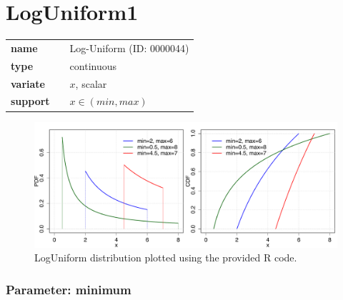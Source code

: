 %
%
\section*{LogUniform1} 

  \bigskip 

\begin{tabular}{p{2cm}cl}
\textbf{name} & & Log-Uniform (ID: 0000044)\\ 
 
\textbf{type} & & continuous \\ 

\textbf{variate} & & $x$, scalar \\ 

\textbf{support} & & $x \in (min,max)$
\end{tabular}

\begin{figure}[ht!]
\centering
  \includegraphics[width=140mm]{pics/LogUniform.pdf}
 \caption{LogUniform distribution plotted using the provided R code.}
 \label{fig:LogUniform}
\end{figure}

\subsubsection*{Parameter: minimum}


